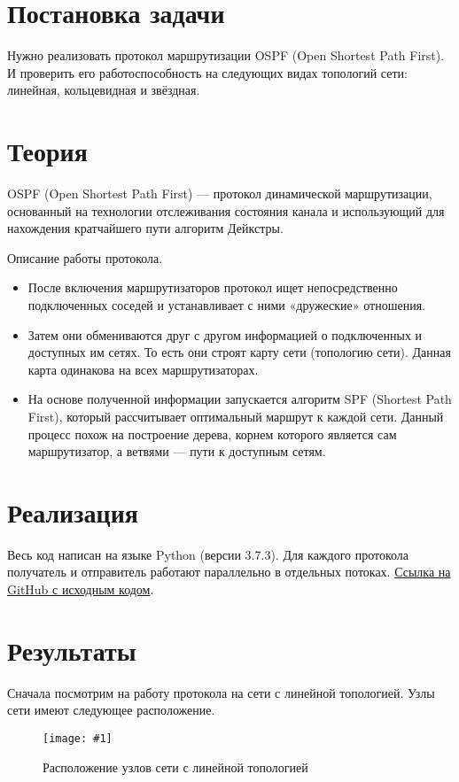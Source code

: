 \documentclass[a4paper,12pt]{article}
\newcommand{\plot}[3]{
    \begin{figure}[H]
        \begin{center}
            \texttt{[image: \#1]}
            \caption{#2}
            \label{#3}
        \end{center}
    \end{figure}
}
\begin{document}
    
    \newpage

    \tableofcontents
    \listoffigures
    \newpage

    \section{Постановка задачи}
    \quad Нужно реализовать протокол маршрутизации OSPF (Open Shortest Path First).
    И проверить его работоспособность на следующих видах топологий сети:
    линейная, кольцевидная и звёздная.

    \section{Теория}
    OSPF (Open Shortest Path First) — протокол динамической маршрутизации,
    основанный на технологии отслеживания состояния канала
    и использующий для нахождения кратчайшего пути алгоритм Дейкстры.

    Описание работы протокола.
    \begin{itemize}
        \item После включения маршрутизаторов протокол ищет непосредственно подключенных соседей
        и устанавливает с ними «дружеские» отношения.
        \item Затем они обмениваются друг с другом информацией о подключенных и доступных им сетях.
        То есть они строят карту сети (топологию сети).
        Данная карта одинакова на всех маршрутизаторах.
        \item На основе полученной информации запускается алгоритм SPF (Shortest Path First),
        который рассчитывает оптимальный маршрут к каждой сети.
        Данный процесс похож на построение дерева, корнем которого является сам маршрутизатор,
        а ветвями — пути к доступным сетям.
    \end{itemize}

    \section{Реализация}
    \quad Весь код написан на языке Python (версии 3.7.3).
    Для каждого протокола получатель и отправитель работают параллельно в отдельных потоках.
    \href{https://github.com/kirillkuks/Networks/tree/master/lab2}{Ссылка на GitHub с исходным кодом}.

    \section{Результаты}
    Сначала посмотрим на работу протокола на сети с линейной топологией.
    Узлы сети имеют следующее расположение.
    \plot{full_line_points}{Расположение узлов сети с линейной топологией}{p:fullLinePoints}
\end{document}
